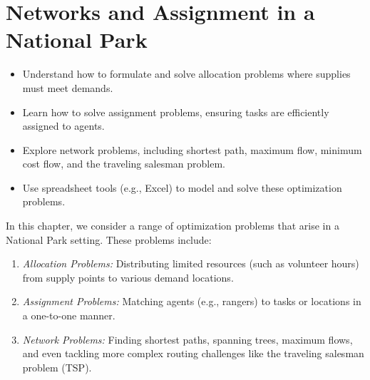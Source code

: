 %
%


\chapter{Networks and Assignment in a National Park}

\begin{outcome}
\begin{itemize}
\item Understand how to formulate and solve allocation problems where supplies must meet demands.
\item Learn how to solve assignment problems, ensuring tasks are efficiently assigned to agents.
\item Explore network problems, including shortest path, maximum flow, minimum cost flow, and the traveling salesman problem.
\item Use spreadsheet tools (e.g., Excel) to model and solve these optimization problems.
\end{itemize}
\end{outcome}

In this chapter, we consider a range of optimization problems that arise in a National Park setting. These problems include:

\begin{enumerate}
  \item \emph{Allocation Problems:} Distributing limited resources (such as volunteer hours) from supply points to various demand locations.
  \item \emph{Assignment Problems:} Matching agents (e.g., rangers) to tasks or locations in a one-to-one manner.
  \item \emph{Network Problems:} Finding shortest paths, spanning trees, maximum flows, and even tackling more complex routing challenges like the traveling salesman problem (TSP).
\end{enumerate}

